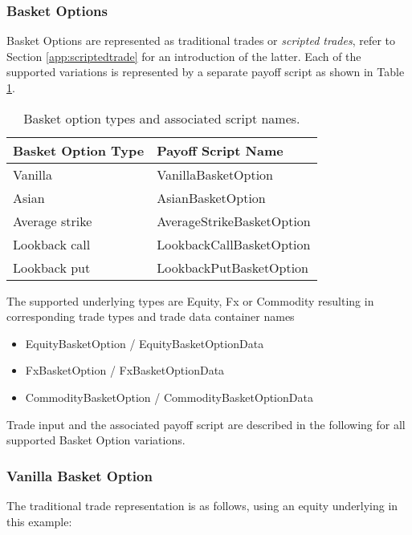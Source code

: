 \subsubsection{Basket Options}

Basket Options are represented as traditional trades or {\em scripted trades}, refer to Section \ref{app:scriptedtrade}
for an introduction of the latter. Each of the supported variations is represented by a separate payoff script as shown
in Table \ref{tab:basketoptions}.

\begin{table}[hbt]
\begin{center}
\begin{tabular}{|l|l|}
\hline
Basket Option Type & Payoff Script Name \\
\hline
\hline
Vanilla & VanillaBasketOption \\
\hline
Asian & AsianBasketOption \\
\hline
Average strike & AverageStrikeBasketOption \\
\hline
Lookback call & LookbackCallBasketOption \\
\hline
Lookback put & LookbackPutBasketOption \\
\hline
\end{tabular}
\end{center}
\caption{Basket option types and associated script names.}
\label{tab:basketoptions}
\end{table}

The supported underlying types are Equity, Fx or Commodity resulting in corresponding trade types and trade data
container names

\begin{itemize}
  \item EquityBasketOption / EquityBasketOptionData
  \item FxBasketOption / FxBasketOptionData
  \item CommodityBasketOption / CommodityBasketOptionData
\end{itemize}

Trade input and the associated payoff script are described in the following for all supported Basket Option variations.

\subsubsection*{Vanilla Basket Option}

The traditional trade representation is as follows, using an equity underlying in this example:

